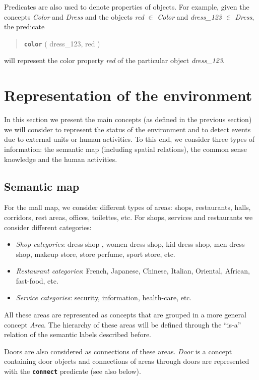 \documentclass{article}
\begin{document}
Predicates are also used to denote properties of objects. For example, given the concepts \emph{Color} and \emph{Dress} and the objects \emph{red} $\in$ \emph{Color} and \emph{dress\_123} $\in$ \emph{Dress}, the predicate 

\begin{quote}
{\tt\bf color} ( dress\_123,  red )
\end{quote}

\noindent
will represent the color property \emph{red} of the particular object  \emph{dress\_123}.


\section {Representation of the environment}

In this section we present the main concepts (as defined in the previous section) we will consider to represent the status of the environment and to detect events due to external units or human activities. To this end, we consider three types of information: the semantic map (including spatial relations), the common sense knowledge and the human activities.

\subsection{Semantic map}

For the mall map, we consider different types of areas: shops, restaurants, halls, corridors, rest areas, offices, toilettes, etc. For shops, services and restaurants we consider different categories:
\begin{itemize}
\item {\it Shop categories}: dress shop , women dress shop, kid dress shop, men dress shop, makeup store, store perfume, sport store, etc.
\item {\it Restaurant categories}: French, Japanese, Chinese, Italian, Oriental, African, fast-food, etc.
\item {\it Service categories}: security, information, health-care, etc.
\end{itemize}

All these areas are represented as concepts that are grouped in a more general concept \emph{Area}. The hierarchy of these areas will be defined through the ``is-a'' relation of the semantic labels described before.

Doors are also considered as connections of these areas. \emph{Door} is a concept containing door objects and connections of areas through doors are represented with the {\tt\bf connect} predicate (see also below).
\end{document}

